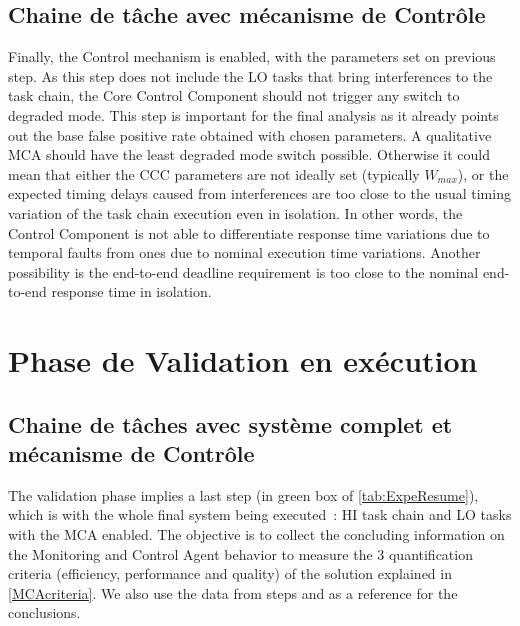 \documentclass[french, a4paper, 11pt, twoside, pdftex]{StyleThese}
\begin{document}
    \subsection{Chaine de tâche avec mécanisme de Contrôle}
                	Finally, the Control mechanism is enabled, with the parameters set on previous step. As this step does not include the LO tasks that bring interferences to the task chain, the Core Control Component should not trigger any switch to degraded mode. This step is important for the final analysis as it already points out the base false positive rate obtained with chosen parameters. A qualitative MCA should have the least degraded mode switch possible. Otherwise it could mean that either the CCC parameters are not ideally set (typically $W_{max}$), or the expected timing delays caused from interferences are too close to the usual timing variation of the task chain execution even in isolation. In other words, the Control Component is not able to differentiate response time variations due to temporal faults from ones due to nominal execution time variations. Another possibility is the end-to-end deadline requirement is too close to the nominal end-to-end response time in isolation. %
                	
                	
\section{Phase de Validation en exécution}
    \subsection{Chaine de tâches avec système complet et mécanisme de Contrôle}
                    The validation phase implies a last step (\circleTxt[7] in green box of \autoref{tab:ExpeResume}), which is with the whole final system being executed~: HI task chain and LO tasks with the MCA enabled. The objective is to collect the concluding information on the Monitoring and Control Agent behavior to measure the 3 quantification criteria (efficiency, performance and quality) of the solution explained in \autoref{MCAcriteria}. We also use the data from steps \circleTxt[3] and \circleTxt[6] as a reference for the conclusions.
\ifdefined{}
\else


\end{document}
